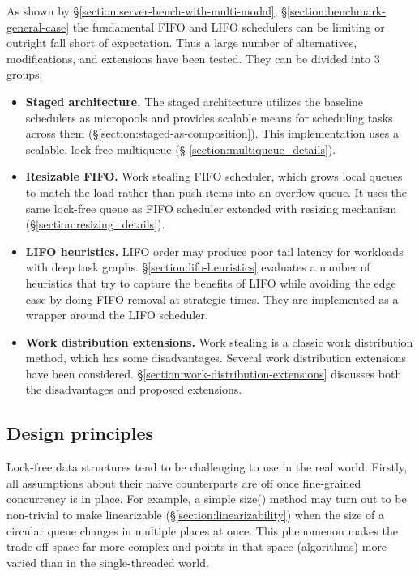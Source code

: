 \documentclass[12pt,a4paper,twoside]{report}
\begin{document}
As shown by \S\ref{section:server-bench-with-multi-modal}, \S\ref{section:benchmark-general-case} the fundamental FIFO and LIFO schedulers can be limiting or outright fall short of expectation. Thus a large number of alternatives, modifications, and extensions have been tested. They can be divided into 3 groups:
\begin{itemize}
    \item \textbf{Staged architecture.} The staged architecture utilizes the baseline schedulers as micropools and provides scalable means for scheduling tasks across them (\S\ref{section:staged-as-composition}). This implementation uses a scalable, lock-free multiqueue (\S
    \ref{section:multiqueue_details}).
    \item \textbf{Resizable FIFO.} Work stealing FIFO scheduler, which grows local queues to match the load rather than push items into an overflow queue. It uses the same lock-free queue as FIFO scheduler extended with resizing mechanism (\S\ref{section:resizing_details}).
    \item \textbf{LIFO heuristics.}  LIFO order may produce poor tail latency for workloads with deep task graphs. \S\ref{section:lifo-heuristics} evaluates a number of heuristics that try to capture the benefits of LIFO while avoiding the edge case by doing FIFO removal at strategic times. They are implemented as a wrapper around the LIFO scheduler.
    \item \textbf{Work distribution extensions.} Work stealing is a classic work distribution method, which has some disadvantages. Several work distribution extensions have been considered. \S\ref{section:work-distribution-extensions} discusses both the disadvantages and proposed extensions. 
\end{itemize} 

\subsection{Design principles}
\label{section:lock-free-design-principles}

Lock-free data structures tend to be challenging to use in the real world. Firstly, all assumptions about their naive counterparts are off once fine-grained concurrency is in place. For example, a simple size() method may turn out to be non-trivial to make linearizable (\S\ref{section:linearizability}) when the size of a circular queue changes in multiple places at once. This phenomenon makes the trade-off space far more complex and points in that space (algorithms) more varied than in the single-threaded world.
\end{document}
